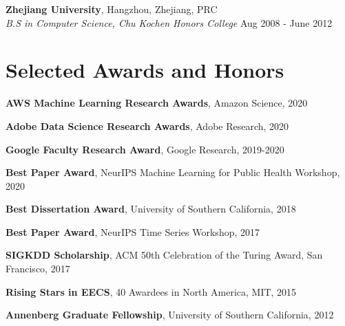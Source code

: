 \documentclass[margin,line]{res}
\newenvironment{list1}{
  \begin{list}{\ding{113}}{%
      \setlength{\itemsep}{0in}
      \setlength{\parsep}{0in} \setlength{\parskip}{0in}
      \setlength{\topsep}{0in} \setlength{\partopsep}{0in} 
      \setlength{\leftmargin}{0.17in}}}{\end{list}}
\newenvironment{list2}{
  \begin{list}{$\bullet$}{%
      \setlength{\itemsep}{0in}
      \setlength{\parsep}{0in} \setlength{\parskip}{0in}
      \setlength{\topsep}{0in} \setlength{\partopsep}{0in} 
      \setlength{\leftmargin}{0.2in}}}{\end{list}}
\begin{document}
\begin{resume}
{\bf Zhejiang University}, Hangzhou, Zhejiang, PRC\\
{\em B.S in Computer Science, Chu Kochen Honors College} \hfill {Aug 2008 - June 2012}



\section{\sc Selected Awards and Honors} 

\textbf{AWS Machine Learning Research Awards},  Amazon Science, 2020

\textbf{Adobe Data Science Research Awards},  Adobe Research, 2020

\textbf{Google Faculty Research  Award},  Google Research, 2019-2020

\textbf{Best Paper Award},  NeurIPS Machine Learning for Public Health Workshop, 2020


\textbf{Best Dissertation Award}, University of Southern California, 2018

\textbf{Best Paper Award},  NeurIPS Time Series Workshop, 2017

\textbf{SIGKDD Scholarship},  ACM 50th Celebration of the Turing Award, San Francisco, 2017

\textbf{Rising Stars in EECS},  40 Awardees in North America, MIT, 2015

\textbf{Annenberg Graduate Fellowship}, University of Southern California, 2012








\end{resume}
\end{document}
